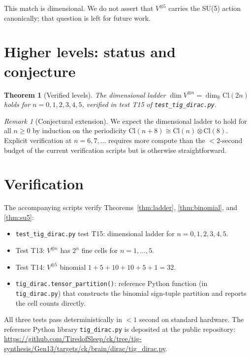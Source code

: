 \documentclass[11pt,reqno]{amsart}
\theoremstyle{plain}
\newtheorem{theorem}{Theorem}[section]
\theoremstyle{definition}
\theoremstyle{remark}
\newtheorem*{remark}{Remark}
\newcommand{\R}{\mathbb{R}}
\newcommand{\Cl}{\mathrm{Cl}}
\begin{document}
This match is dimensional. We do not assert that $V^{\otimes 5}$
carries the SU(5) action canonically; that question is left for future
work.

\section{Higher levels: status and conjecture}

\begin{theorem}[Verified levels]
The dimensional ladder $\dim V^{\otimes n} = \dim_\R \Cl(2n)$ holds for
$n = 0, 1, 2, 3, 4, 5$, verified in test T15 of
\texttt{test\_tig\_dirac.py}.
\end{theorem}

\begin{remark}[Conjectural extension]
We expect the dimensional ladder to hold for all $n \geq 0$ by
induction on the periodicity $\Cl(n+8) \cong \Cl(n) \otimes \Cl(8)$.
Explicit verification at $n = 6, 7, \ldots$ requires more compute than
the $<2$-second budget of the current verification scripts but is
otherwise straightforward.
\end{remark}

\section{Verification}

The accompanying scripts verify Theorems~\ref{thm:ladder},
\ref{thm:binomial}, and \ref{thm:su5}:
\begin{itemize}
\item \texttt{test\_tig\_dirac.py} test T15: dimensional ladder for
$n = 0, 1, 2, 3, 4, 5$.
\item Test T13: $V^{\otimes n}$ has $2^n$ fine cells for
$n = 1, \ldots, 5$.
\item Test T14: $V^{\otimes 5}$ binomial $1+5+10+10+5+1 = 32$.
\item \texttt{tig\_dirac.tensor\_partition()}: reference Python
function (in \texttt{tig\_dirac.py}) that constructs the binomial
sign-tuple partition and reports the cell counts directly.
\end{itemize}

All three tests pass deterministically in $<1$ second on standard
hardware. The reference Python library \texttt{tig\_dirac.py} is
deposited at the public repository:
\url{https://github.com/TiredofSleep/ck/tree/tig-synthesis/Gen13/targets/ck/brain/dirac/tig_dirac.py}.
\end{document}
